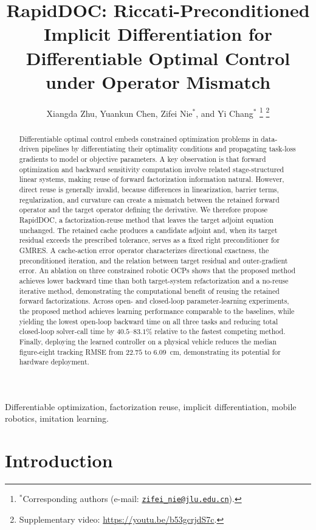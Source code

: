 \documentclass[letterpaper,10pt,conference]{ieeeconf}
\title{\LARGE \bf
RapidDOC: Riccati-Preconditioned Implicit Differentiation for
Differentiable Optimal Control under Operator Mismatch
}
\author{Xiangda Zhu, Yuankun Chen, Zifei Nie$^{*}$, and Yi Chang$^{*}$%
\thanks{$^{*}$Corresponding authors (e-mail: \href{mailto:zifei_nie@jlu.edu.cn}{\nolinkurl{zifei_nie@jlu.edu.cn}}).}%
\thanks{Supplementary video: \url{https://youtu.be/b53gcrjdS7c}.}}
\begin{document}
\maketitle
\thispagestyle{empty}
\pagestyle{empty}


\begin{abstract}
Differentiable optimal control embeds constrained optimization problems in data-driven pipelines by differentiating their optimality conditions and propagating task-loss gradients to model or objective parameters.
A key observation is that forward optimization and backward sensitivity computation involve related stage-structured linear systems, making reuse of forward factorization information natural. However, direct reuse is generally invalid, because differences in linearization, barrier terms, regularization, and curvature can create a mismatch between the retained forward operator and the target operator defining the derivative.
We therefore propose RapidDOC, a factorization-reuse method that leaves
the target adjoint equation unchanged. The retained cache produces a candidate
adjoint and, when its target residual exceeds the prescribed tolerance,
serves as a fixed right preconditioner for GMRES. A cache-action error
operator characterizes directional exactness, the preconditioned
iteration, and the relation between target residual and outer-gradient
error.
An ablation on three constrained robotic OCPs shows that the proposed method achieves lower backward time than both target-system refactorization and a no-reuse iterative method, demonstrating the computational benefit of reusing the retained forward factorizations.
Across open- and closed-loop parameter-learning experiments, the
proposed method achieves learning performance comparable to the
baselines, while yielding the lowest open-loop backward time on all
three tasks and reducing total closed-loop solver-call time by
$40.5$--$83.1\%$ relative to the fastest competing method.
Finally, deploying the learned controller on a physical vehicle reduces the median figure-eight tracking RMSE from $22.75$ to $6.09$~cm, demonstrating its potential for hardware deployment.
\end{abstract}

\begin{keywords}
Differentiable optimization, factorization reuse, implicit differentiation,  mobile robotics, imitation learning.
\end{keywords}
\section{Introduction}
\end{document}
